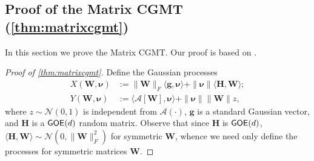 \documentclass[10pt]{article}
\theoremstyle{definition}
\begin{document}
\subsection{Proof of the Matrix CGMT (\cref{thm:matrixcgmt})}
\label{sec:cgmtproof}
In this section we prove the Matrix CGMT.  Our proof is based on \citet{miolane_distribution_2021}.  

\begin{proof}[Proof of \cref{thm:matrixcgmt}]
Define the Gaussian processes
\begin{align}
    X(\bm{W},\bm{\nu}) &:= \| \bm{W} \|_F \langle \bm{g}, \bm{\nu} \rangle + \| \bm{\nu} \|\langle \bm{H}, \bm{W} \rangle; \\
    Y(\bm{W},\bm{\nu} ) &:= \langle \mathcal{A}[\bm{W}], \bm{\nu} \rangle + \| \bm{\nu} \| \| \bm{W} \| z,
\end{align}
where $z \sim \mathcal{N}(0,1)$ is independent from $\mathcal{A}(\cdot)$, $\bm{g}$ is a standard Gaussian vector, and $\bm{H}$ is a ${\sf GOE}(d)$ random matrix.  Observe that since $\bm{H}$ is ${\sf GOE}(d)$, $\langle \bm{H}, \bm{W} \rangle \sim \mathcal{N}(0, \| \bm{W} \|_F^2)$ for symmetric $\bm{W}$, whence we need only define the processes for symmetric matrices $\bm{W}$.


\end{proof}
\end{document}
